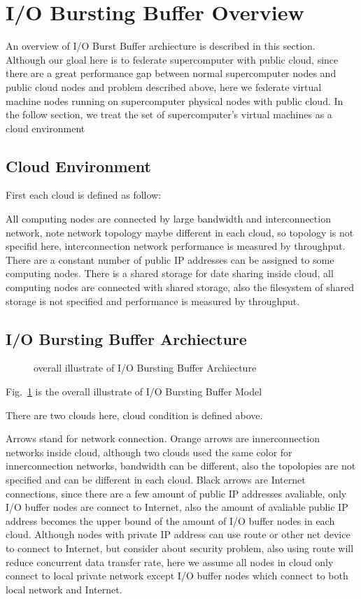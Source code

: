 \documentclass[JIP,draft]{ipsj}
\begin{document}
\section{I/O Bursting Buffer Overview}
An overview of I/O Burst Buffer archiecture is described in this section. 
Although our gloal here is to federate supercomputer with public cloud, since there are a great performance gap between normal supercomputer nodes and public cloud nodes and problem described above, here we federate virtual machine nodes running on supercomputer physical nodes with public cloud.
In the follow section, we treat the set of supercomputer's virtual machines as a cloud environment

\subsection{Cloud Environment}
First each cloud is defined as follow:

All computing nodes are connected by large bandwidth and interconnection network, note network topology maybe different in each cloud, so topology is not specifid here, interconnection network performance is measured by throughput.
There are a constant number of public IP addresses can be assigned to some computing nodes.
There is a shared storage for date sharing inside cloud, all computing nodes are connected with shared storage, also the filesystem of shared storage is not specified and performance is measured by throughput.


\subsection{I/O Bursting Buffer Archiecture}

\begin{figure}[tb]
	\centering
	\caption{overall illustrate of I/O Bursting Buffer Archiecture}
	\label{overview}
\end{figure}

Fig.~\ref{overview} is the overall illustrate of I/O Bursting Buffer Model

There are two clouds here, cloud condition is defined above.

Arrows stand for network connection.
Orange arrows are innerconnection networks inside cloud, although two clouds used the same color for innerconnection networks, bandwidth can be different, also the topolopies are not specified and can be different in each cloud.
Black arrows are Internet connections, since there are a few amount of public IP addresses avaliable, only I/O buffer nodes are connect to Internet, also the amount of avaliable public IP address becomes the upper bound of the amount of I/O buffer nodes in each cloud. 
Although nodes with private IP address can use route or other net device to connect to Internet, but consider about security problem, also using route will reduce concurrent data transfer rate, here we assume all nodes in cloud only connect to local private network except I/O buffer nodes which connect to both local network and Internet.
\end{document}
